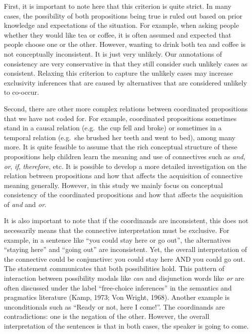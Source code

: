 \documentclass[floatsintext,man]{apa6}
\theoremstyle{definition}
\theoremstyle{definition}
\theoremstyle{definition}
\theoremstyle{remark}
\begin{document}
First, it is important to note here that this criterion is quite strict.
In many cases, the possibility of both propositions being true is ruled
out based on prior knowledge and expectations of the situation. For
example, when asking people whether they would like tea or coffee, it is
often assumed and expected that people choose one or the other. However,
wanting to drink both tea and coffee is not conceptually inconsistent.
It is just very unlikely. Our annotations of consistency are very
conservative in that they still consider such unlikely cases as
consistent. Relaxing this criterion to capture the unlikely cases may
increase exclusivity inferences that are caused by alternatives that are
considered unlikely to co-occur.

Second, there are other more complex relations between coordinated
propositions that we have not coded for. For example, coordinated
propositions sometimes stand in a causal relation (e.g.~the cup fell and
broke) or sometimes in a temporal relation (e.g.~she brushed her teeth
and went to bed), among many more. It is quite feasible to assume that
the rich conceptual structure of these propositions help children learn
the meaning and use of connectives such as \emph{and}, \emph{or},
\emph{if}, \emph{therefore}, etc. It is possible to develop a more
detailed investigation on the relation between propositions and how that
affects the acquisition of connective meaning generally. However, in
this study we mainly focus on conceptual consistency of the coordinated
propositions and how that affects the acquisition of \emph{and} and
\emph{or}.

It is also important to note that if the coordinands are inconsistent,
this does not necessarily means that the connective interpretation must
be exclusive. For example, in a sentence like \enquote{you could stay
here or go out}, the alternatives \enquote{staying here} and
\enquote{going out} are inconsistent. Yet, the overall interpretation of
the connective could be conjunctive: you could stay here AND you could
go out. The statement communicates that both possibilities hold. This
pattern of interaction between possibility modals like \emph{can} and
disjunction words like \emph{or} are often discussed under the label
\enquote{free-choice inferences} in the semantics and pragmatics
literature (Kamp, 1973; Von Wright, 1968). Another example is
unconditionals such as \enquote{Ready or not, here I come!}. The
coordinands are contradictions: one is the negation of the other.
However, the overall interpretation of the sentences is that in both
cases, the speaker is going to come.
\end{document}
